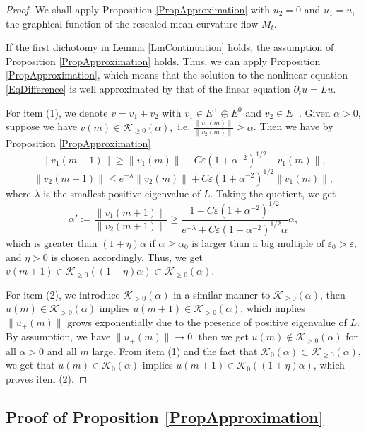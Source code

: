 \documentclass[11pt]{amsart}
\numberwithin{equation}{section}
\numberwithin{equation}{section}
\newcommand{\eps}{\varepsilon}
\newcommand{\cK}{\mathcal{K}}
\begin{document}
	
	\begin{proof}
		We shall apply Proposition \ref{PropApproximation} with $u_2=0$ and $u_1=u$, the graphical function of the rescaled mean curvature flow $M_t$. 
		
		If the first dichotomy in Lemma \ref{LmContinuation} holds, the assumption of Proposition \ref{PropApproximation} holds. Thus, we can apply Proposition \ref{PropApproximation}, which means that the solution to the nonlinear equation \eqref{EqDifference} is well approximated by that of the linear equation $\partial_tu=Lu$. 
		
		For item (1), we denote $v=v_1+v_2$ with $v_1\in E^+\oplus E^0$ and $v_2\in E^-$. Given $\alpha>0$, suppose we have $v(m)\in \cK_{\geq 0}(\alpha),$ i.e. $\frac{\|v_1(m)\|}{\|v_2(m)\|}\geq \alpha$. Then we have by Proposition \ref{PropApproximation}
		$$\|v_1(m+1)\|\geq \|v_1(m)\|-C\eps(1+\alpha^{-2})^{1/2}\|v_1(m)\|,$$
		$$\|v_2(m+1)\|\leq e^{-\lambda}\| v_2(m)\|+C\eps (1+\alpha^{-2})^{1/2}\|v_1(m)\|,$$
		where $\lambda$ is the smallest positive eigenvalue of $L$. Taking the quotient, we get 
		\begin{equation}\label{Eqalpha}
			\alpha':=\frac{\|v_1(m+1)\|}{\|v_2(m+1)\|}\geq \frac{1-C\eps(1+\alpha^{-2})^{1/2}}{e^{-\lambda}+C\eps(1+\alpha^{-2})^{1/2}\alpha}\alpha,    
		\end{equation}
		which is greater than $(1+\eta)\alpha$ if $\alpha\geq \alpha_0$ is larger than a big multiple of $\eps_0>\eps$, and $\eta>0$ is chosen accordingly. Thus, we get $v(m+1)\in \cK_{\geq 0}((1+\eta)\alpha)\subset \cK_{\geq 0}(\alpha)$. 
		
		For item (2), we introduce $\cK_{>0}(\alpha)$ in a similar manner to $\cK_{\geq 0}(\alpha)$, then $u(m)\in \cK_{> 0}(\alpha)$ implies $u(m+1)\in \cK_{> 0}(\alpha)$, which implies $\|u_+(m)\|$ grows exponentially due to the presence of positive eigenvalue of $L$. By assumption, we have $\|u_+(m)\|\to 0$, then we get $u(m)\notin \cK_{> 0}(\alpha)$ for all $\alpha>0$ and all $m$ large. From item (1) and the fact that $\cK_0(\alpha)\subset \cK_{\geq 0}(\alpha)$, we get that $u(m)\in \cK_0(\alpha)$ implies $u(m+1)\in \cK_0((1+\eta)\alpha)$, which proves item (2). 
		
	\end{proof}
	\subsection{Proof of Proposition \ref{PropApproximation}}\label{SS:proofofPropCone}
	
\end{document}
